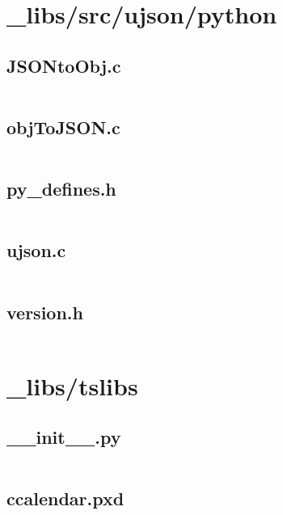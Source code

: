 \documentclass{article}
\begin{document}
\section{\_libs/src/ujson/python}

\subsection{JSONtoObj.c}
\inputminted{c}{/home/dufferzafar/dev/@clones/pandas/pandas/_libs/src/ujson/python/JSONtoObj.c}
\newpage

\subsection{objToJSON.c}
\inputminted{c}{/home/dufferzafar/dev/@clones/pandas/pandas/_libs/src/ujson/python/objToJSON.c}
\newpage

\subsection{py\_defines.h}
\inputminted{c}{/home/dufferzafar/dev/@clones/pandas/pandas/_libs/src/ujson/python/py_defines.h}
\newpage

\subsection{ujson.c}
\inputminted{c}{/home/dufferzafar/dev/@clones/pandas/pandas/_libs/src/ujson/python/ujson.c}
\newpage

\subsection{version.h}
\inputminted{c}{/home/dufferzafar/dev/@clones/pandas/pandas/_libs/src/ujson/python/version.h}
\newpage

\section{\_libs/tslibs}

\subsection{\_\_init\_\_.py}
\inputminted{python}{/home/dufferzafar/dev/@clones/pandas/pandas/_libs/tslibs/__init__.py}
\newpage

\subsection{ccalendar.pxd}
\inputminted{cython}{/home/dufferzafar/dev/@clones/pandas/pandas/_libs/tslibs/ccalendar.pxd}
\newpage
\end{document}
